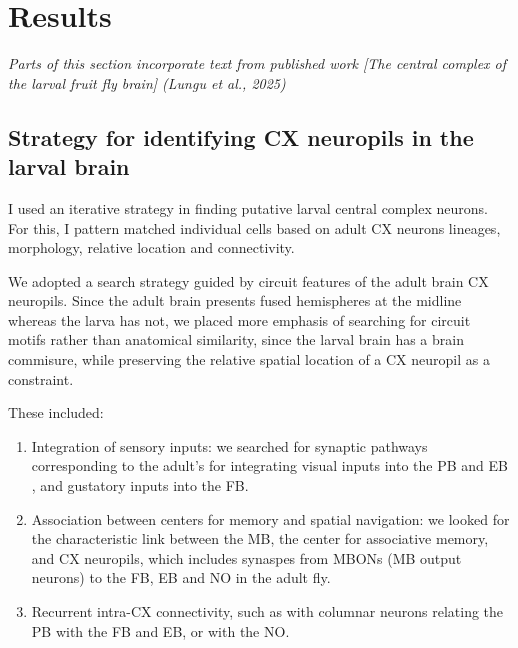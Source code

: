 \chapter{Results}
\textit{Parts of this section incorporate text from published work [The central complex of the larval fruit fly brain] (Lungu et al., 2025)}

\section{Strategy for identifying CX neuropils in the larval brain}

I used an iterative strategy in finding putative larval central complex neurons. For this, I pattern matched individual cells based on adult CX neurons lineages, morphology, relative location and connectivity. %

We adopted a search strategy guided by circuit features of the adult brain CX neuropils.
Since the adult brain presents fused hemispheres at the midline whereas the larva has not, we placed more emphasis of searching for circuit motifs rather than anatomical similarity, since the larval brain has a brain commisure, while preserving the relative spatial location of a CX neuropil as a constraint.

These included:
\begin{enumerate}
 \item Integration of sensory inputs: we searched for synaptic pathways corresponding to the adult's for integrating visual inputs into the PB and EB \citep{hulse2021connectome}, and gustatory inputs into the FB.
 \item Association between centers for memory and spatial navigation: we looked for the characteristic link between the MB, the center for associative memory, and CX neuropils, which includes synaspes from MBONs (MB output neurons) to the FB, EB and NO in the adult fly.
 \item Recurrent intra-CX connectivity, such as with columnar neurons relating the PB with the FB and EB, or with the NO.
\end{enumerate}

